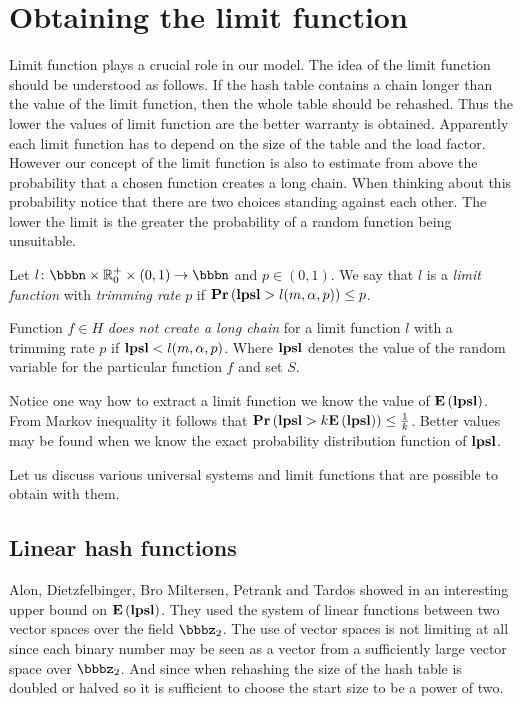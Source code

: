 \section{Obtaining the limit function}
\label{section-limit}
Limit function plays a crucial role in our model. The idea of the limit function should be understood as follows. If the hash table contains a chain longer than the value of the limit function, then the whole table should be rehashed. Thus the lower the values of limit function are the better warranty is obtained. Apparently each limit function has to depend on the size of the table and the load factor. However our concept of the limit function is also to estimate from above the probability that a chosen function creates a long chain. When thinking about this probability notice that there are two choices standing against each other. The lower the limit is the greater the probability of a random function being unsuitable.

\begin{definition}
Let $l\colon \bbbn \times \mathbb{R}_0^+ \times (0, 1) \rightarrow \bbbn$ and $p \in (0, 1)$.  We say that $l$ is a \emph{limit function} with \emph{trimming rate} $p$ if $\mathbf{Pr}\left(\mathbf{lpsl} > l(m, \alpha, p)\right) \leq p$.

Function $f \in H$ \emph{does not create a long chain} for a limit function $l$ with a trimming rate $p$ if $\mathbf{lpsl} < l(m, \alpha, p)$. Where $\mathbf{lpsl}$ denotes the value of the random variable for the particular function $f$ and set $S$.
\end{definition}

Notice one way how to extract a limit function we know the value of $\mathbf{E}\left(\mathbf{lpsl}\right)$. From Markov inequality it follows that $\mathbf{Pr}\left(\mathbf{lpsl} > k \mathbf{E}\left(\mathbf{lpsl}\right)\right) \leq \frac{1}{k}$. Better values may be found when we know the exact probability distribution function of $\mathbf{lpsl}$.

Let us discuss various universal systems and limit functions that are possible to obtain with them.

\subsection{Linear hash functions}
Alon, Dietzfelbinger, Bro Miltersen, Petrank and Tardos showed in \cite{DBLP:journals/jacm/AlonDMPT99} an interesting upper bound on $\mathbf{E}\left(\mathbf{lpsl}\right)$. They used the system of linear functions between two vector spaces over the field $\bbbz_2$. The use of vector spaces is not limiting at all since each binary number may be seen as a vector from a sufficiently large vector space over $\bbbz_2$. And since when rehashing the size of the hash table is doubled or halved so it is sufficient to choose the start size to be a power of two.

